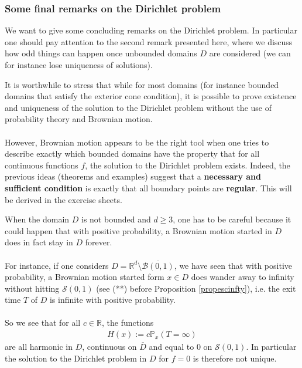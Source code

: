\documentclass[../mainfile.tex]{subfiles}
\begin{document}
\subsubsection{Some final remarks on the Dirichlet problem}
We want to give some concluding remarks on the Dirichlet problem. In particular one should pay attention to the second remark presented here, where we discuss how odd things can happen once unbounded domains $D$ are considered (we can for instance lose uniqueness of solutions).
\begin{rem} It is worthwhile to stress that while for most domains (for instance bounded domains that satisfy the exterior cone condition), it is possible to prove existence and uniqueness of the solution to the Dirichlet problem without the use of probability theory and Brownian motion. \\
\\
However, Brownian motion appears to be the right tool when one tries to describe exactly which bounded domains have the property that for all continuous functions $f$, the solution to the Dirichlet problem exists. Indeed, the previous ideas (theorems and examples) suggest that a \textbf{necessary and sufficient condition} is exactly that all boundary points are \textbf{regular}. This will be derived in the exercise sheets. 
\end{rem}
\begin{rem} When the domain $D$ is not bounded and $d  \geq 3$, one has to be careful because it could happen that with positive probability, a Brownian motion started in $D$ does in fact stay in $D$ forever.
\\
\\
For instance, if one considers $D= \mathbb{R}^d \setminus \overline{\mathcal{B}(0,1)}$, we have seen that with positive probability, a Brownian motion started form $x \in D$ does wander away to infinity without hitting $\mathcal{S}(0,1)$ (see (**) before Proposition \ref{propescinfty}), i.e. the exit time $T$ of $D$ is infinite with positive probability. 
\\
\\
So we see that for all $c \in \mathbb{R}$,  the functions 
\begin{align*}
H(x):= c \mathbb{P}_x(T = \infty)
\end{align*}
are all harmonic in $D$, continuous on $\overline{D}$ and equal to $0$ on $\mathcal{S}(0,1)$. In particular the solution to the Dirichlet problem in $D$ for $f=0$ is therefore not unique. 
\end{rem}
\newpage
\end{document}

